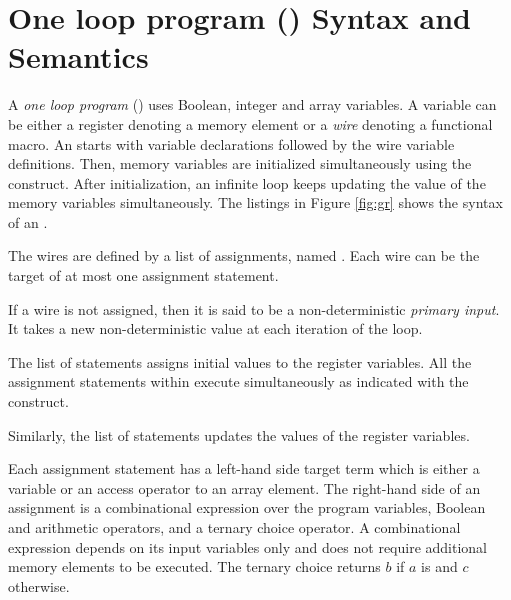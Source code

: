 \section{One loop program (\caig) Syntax and Semantics}
\label{sec:this}
A {\em one loop program} (\caig) uses Boolean, 
integer and array variables. 
A variable can be either a register denoting a memory element or a {\em wire} denoting a functional macro.
An \caig starts with variable declarations followed by the wire variable definitions. 
Then, memory variables are initialized simultaneously using the  construct. 
After initialization, an infinite loop keeps updating the value of the memory variables simultaneously. The listings in Figure \ref{fig:gr} shows the syntax of an \caig. 


The wires are defined by a list of assignments, named . 
Each wire can be the target of at most one assignment statement. 

If a wire is not assigned, then it is said to be a non-deterministic {\em primary input}. 
It takes a new non-deterministic value at each iteration of the loop.

The list of statements  assigns initial values to 
the register variables. All the assignment statements within  execute
simultaneously as indicated with the  construct.

Similarly, the  list of statements updates the values 
of the register variables. 

Each assignment statement has a left-hand side target term 
which is either a variable or an access operator to an 
array element. 
The right-hand side of an assignment is a combinational expression over the program variables,  
Boolean and arithmetic operators, and a ternary choice 
operator. 
A combinational expression depends on its input variables only and does not require additional 
memory elements to be executed. 
The ternary choice  returns $b$ if $a$ 
is \true and $c$ otherwise. 

